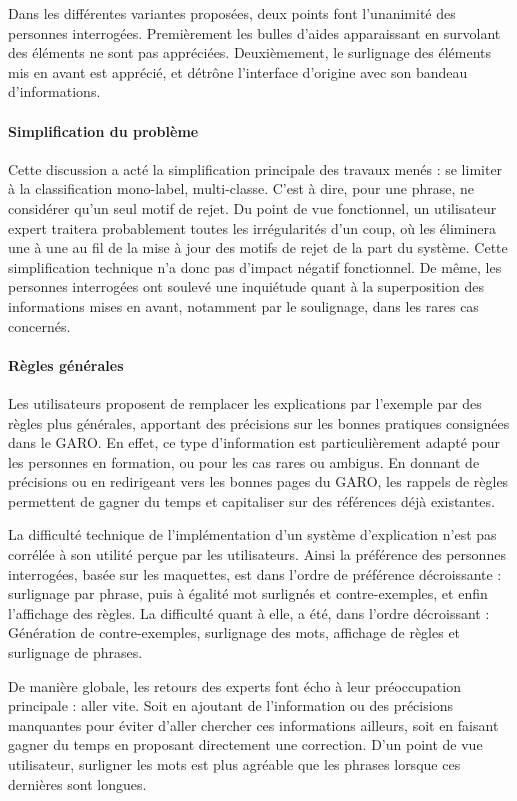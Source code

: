 Dans les différentes variantes proposées, deux points font l'unanimité des personnes interrogées. Premièrement les bulles d'aides apparaissant en survolant des éléments ne sont pas appréciées. Deuxièmement, le surlignage des éléments mis en avant est apprécié, et détrône l'interface d'origine avec son bandeau d'informations.

\paragraph{Simplification du problème}
Cette discussion a acté la simplification principale des travaux menés : se limiter à la classification mono-label, multi-classe. C'est à dire, pour une phrase, ne considérer qu'un seul motif de rejet.
Du point de vue fonctionnel, un utilisateur expert traitera probablement toutes les irrégularités d'un coup, où les éliminera une à une au fil de la mise à jour des motifs de rejet de la part du système.
Cette simplification technique n'a donc pas d'impact négatif fonctionnel.
De même, les personnes interrogées ont soulevé une inquiétude quant à la superposition des informations mises en avant, notamment par le soulignage, dans les rares cas concernés.

\paragraph{Règles générales}
Les utilisateurs proposent de remplacer les explications par l'exemple par des règles plus générales, apportant des précisions sur les bonnes pratiques consignées dans le GARO. En effet, ce type d'information est particulièrement adapté pour les personnes en formation, ou pour les cas rares ou ambigus. En donnant de précisions ou en redirigeant vers les bonnes pages du GARO, les rappels de règles permettent de gagner du temps et capitaliser sur des références déjà existantes.

La difficulté technique de l'implémentation d'un système d'explication n'est pas corrélée à son utilité perçue par les utilisateurs.
Ainsi la préférence des personnes interrogées, basée sur les maquettes, est dans l'ordre de préférence décroissante : surlignage par phrase, puis à égalité mot surlignés et contre-exemples, et enfin l'affichage des règles.
La difficulté quant à elle, a été, dans l'ordre décroissant : Génération de contre-exemples, surlignage des mots, affichage de règles et surlignage de phrases.

De manière globale, les retours des experts font écho à leur préoccupation principale : aller vite. Soit en ajoutant de l'information ou des précisions manquantes pour éviter d'aller chercher ces informations ailleurs, soit en faisant gagner du temps en proposant directement une correction. D'un point de vue utilisateur, surligner les mots est plus agréable que les phrases lorsque ces dernières sont longues.

